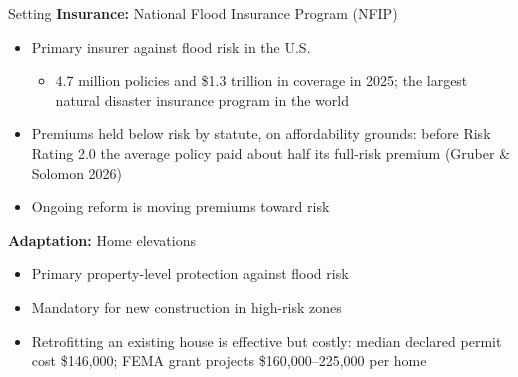 \documentclass[serif, aspectratio=169, 10pt]{beamer}
\begin{document}
\begin{frame}{Setting}
\textbf{Insurance:} National Flood Insurance Program (NFIP)
\begin{itemize}
    \item Primary insurer against flood risk in the U.S.
    \begin{itemize}
        \item 4.7 million policies and \$1.3 trillion in coverage in 2025; the largest natural disaster insurance program in the world
    \end{itemize}
    \item Premiums held below risk by statute, on affordability grounds: before Risk Rating 2.0 the average policy paid about half its full-risk premium (Gruber \& Solomon 2026)
    \item Ongoing reform is moving premiums toward risk
\end{itemize}
\textbf{Adaptation:} Home elevations
\begin{itemize}
    \item Primary property-level protection against flood risk
    \item Mandatory for new construction in high-risk zones
    \item Retrofitting an existing house is effective but costly: median declared permit cost \$146{,}000; FEMA grant projects \$160{,}000--225{,}000 per home
\end{itemize}
\end{frame}
\end{document}
